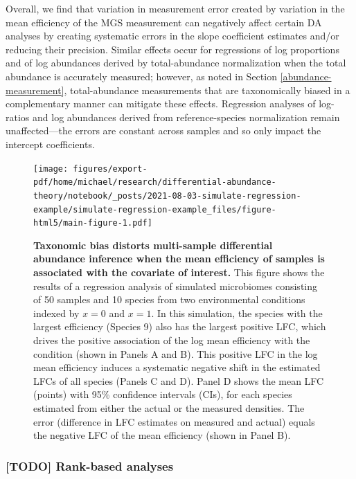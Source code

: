 \documentclass[
]{article}
\begin{document}
Overall, we find that variation in measurement error created by variation in the mean efficiency of the MGS measurement can negatively affect certain DA analyses by creating systematic errors in the slope coefficient estimates and/or reducing their precision.
Similar effects occur for regressions of log proportions and of log abundances derived by total-abundance normalization when the total abundance is accurately measured; however, as noted in Section \ref{abundance-measurement}, total-abundance measurements that are taxonomically biased in a complementary manner can mitigate these effects.
Regression analyses of log-ratios and log abundances derived from reference-species normalization remain unaffected---the errors are constant across samples and so only impact the intercept coefficients.

\begin{figure}
\centering
\texttt{[image: figures/export-pdf/home/michael/research/differential-abundance-theory/notebook/\_posts/2021-08-03-simulate-regression-example/simulate-regression-example\_files/figure-html5/main-figure-1.pdf]}
\caption{\label{fig:regression-example}\textbf{Taxonomic bias distorts multi-sample differential abundance inference when the mean efficiency of samples is associated with the covariate of interest.} This figure shows the results of a regression analysis of simulated microbiomes consisting of 50 samples and 10 species from two environmental conditions indexed by \(x=0\) and \(x=1\). In this simulation, the species with the largest efficiency (Species 9) also has the largest positive LFC, which drives the positive association of the log mean efficiency with the condition (shown in Panels A and B). This positive LFC in the log mean efficiency induces a systematic negative shift in the estimated LFCs of all species (Panels C and D). Panel D shows the mean LFC (points) with 95\% confidence intervals (CIs), for each species estimated from either the actual or the measured densities. The error (difference in LFC estimates on measured and actual) equals the negative LFC of the mean efficiency (shown in Panel B).}
\end{figure}



\hypertarget{todo-rank-based-analyses}{%
\subsubsection{{[}TODO{]} Rank-based analyses}\label{todo-rank-based-analyses}}
\end{document}
